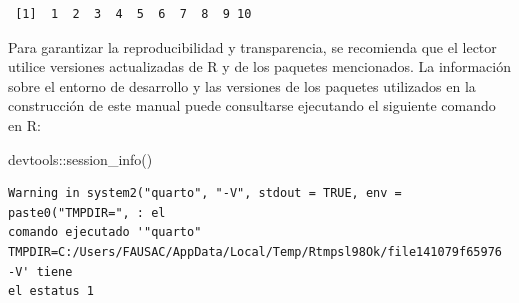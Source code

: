 \documentclass[
  spanish,
  letterpaper,
]{book}
\newenvironment{Shaded}{\begin{snugshade}}{\end{snugshade}}
\newcommand{\FunctionTok}[1]{\textcolor[rgb]{0.28,0.35,0.67}{#1}}
\newcommand{\NormalTok}[1]{\textcolor[rgb]{0.00,0.23,0.31}{#1}}
\newcommand{\SpecialCharTok}[1]{\textcolor[rgb]{0.37,0.37,0.37}{#1}}
\begin{document}
\begin{verbatim}
 [1]  1  2  3  4  5  6  7  8  9 10
\end{verbatim}

Para garantizar la reproducibilidad y transparencia, se recomienda que
el lector utilice versiones actualizadas de R y de los paquetes
mencionados. La información sobre el entorno de desarrollo y las
versiones de los paquetes utilizados en la construcción de este manual
puede consultarse ejecutando el siguiente comando en R:

\begin{Shaded}
\begin{Highlighting}[]
\NormalTok{devtools}\SpecialCharTok{::}\FunctionTok{session\_info}\NormalTok{()}
\end{Highlighting}
\end{Shaded}

\begin{verbatim}
Warning in system2("quarto", "-V", stdout = TRUE, env = paste0("TMPDIR=", : el
comando ejecutado '"quarto"
TMPDIR=C:/Users/FAUSAC/AppData/Local/Temp/Rtmpsl98Ok/file141079f65976 -V' tiene
el estatus 1
\end{verbatim}
\end{document}
